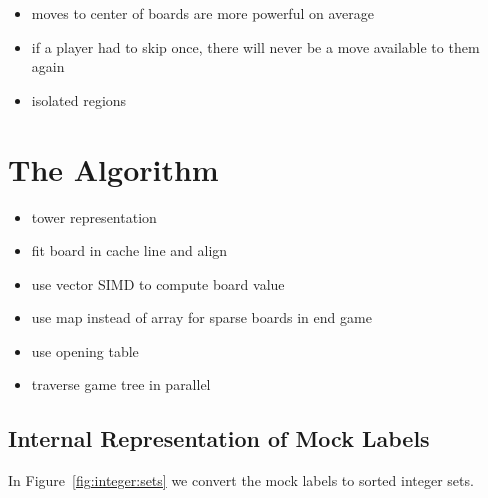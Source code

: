 \documentclass[sigconf]{acmart}
\newcommand{\bl}{\node [circle, minimum size=0.7cm, draw=black, fill=blue!65!white, thin]{};}
\newcommand{\wh}{\node [rectangle, minimum size=0.7cm, draw=black, fill=yellow] {};}
\begin{document}

\begin{itemize}
  \item moves to center of boards are more powerful on average \cite{Althöfer2020}
  \item if a player had to skip once, there will never be a move available to them again
  \item isolated regions
\end{itemize}

\section{The Algorithm}
\begin{itemize}
  \item tower representation
  \item fit board in cache line and align
  \item use vector SIMD to compute board value
  \item use map instead of array for sparse boards in end game
  \item use opening table
  \item traverse game tree in parallel
\end{itemize}

\subsection{Internal Representation of Mock Labels}
\label{sub:sec:internal}

In Figure~\ref{fig:integer:sets} we convert the mock labels to sorted integer sets.
\end{document}
